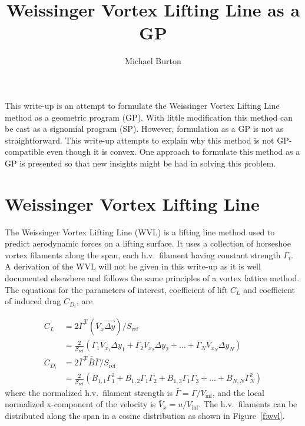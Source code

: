 \documentclass[10pt, a4paper]{article}
\begin{document}
\title{Weissinger Vortex Lifting Line as a GP}
\author{Michael Burton}
\maketitle

This write-up is an attempt to formulate the Weissinger Vortex Lifting Line method as a geometric program (GP).  
With little modification this method can be cast as a signomial program (SP).  
However, formulation as a GP is not as straightforward.  
This write-up attempts to explain why this method is not GP-compatible even though it is convex. 
One approach to formulate this method as a GP is presented so that new insights might be had in solving this problem. 

\section*{Weissinger Vortex Lifting Line}

The Weissinger Vortex Lifting Line (WVL) is a lifting line method used to predict aerodynamic forces on a lifting surface.  It uses a collection of horseshoe vortex filaments along the span, each h.v.\ filament having constant strength $\Gamma_i$. 
A derivation of the WVL will not be given in this write-up as it is well documented elsewhere and follows the same principles of a vortex lattice method. 
The equations for the parameters of interest, coefficient of lift $C_L$ and coefficient of induced drag $C_{D_i}$, are 

\begin{align}
    \label{e:cl}
    C_L &= 2 \bar{\Gamma}^{\mathrm{T}} (\bar{V}_x \vec{\Delta y})/S_{\mathrm{ref}} \\
    &= \frac{2}{S_{\mathrm{ref}}} (\bar{\Gamma}_1 \bar{V}_{x_1} \Delta y_1 + \bar{\Gamma}_2 \bar{V}_{x_2} \Delta y_2 + \dots + \bar{\Gamma}_N \bar{V}_{x_N} \Delta y_N) \nonumber \\
    \label{e:cdi}
    C_{D_i} &= 2 \bar{\Gamma}^{\mathrm{T}} \bar{\bar{B}} \bar{\Gamma}/S_{\mathrm{ref}} \\
            &= \frac{2}{S_{\mathrm{ref}}} (B_{1,1} \Gamma_1^2 + B_{1,2} \Gamma_1 \Gamma_2 + B_{1,3}\Gamma_1 \Gamma_3 + \dots + B_{N,N} \Gamma_N^2) \nonumber
\end{align}
where the normalized h.v.\ filament strength is $ \bar{\Gamma} = \Gamma/V_{\inf}$, and the local normalized x-component of the velocity is $\bar{V}_x = u/V_{\inf}$.
The h.v.\ filaments can be distributed along the span in a cosine distribution as shown in Figure~\ref{f:wvl}.  
\end{document}
